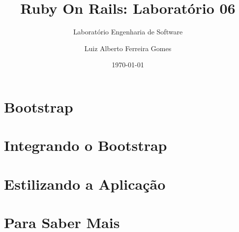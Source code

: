 \documentclass[t, 				             
			   final,
			   12pt, 				         
			   xcolor={usenames,dvipsnames}, 
			   table]{beamer}
\begin{document}
    \author{Luiz Alberto Ferreira Gomes}
    \title{Ruby On Rails: Laboratório 06}
    \subtitle{Laboratório Engenharia de Software}
    \date{\today}
    
    
	  	

  \section{Bootstrap}
		
	
	\section{Integrando o Bootstrap}
		

	\section{Estilizando a Aplicação}
		
		
		
		
		

  	\section{Para Saber Mais}
		
\end{document}
